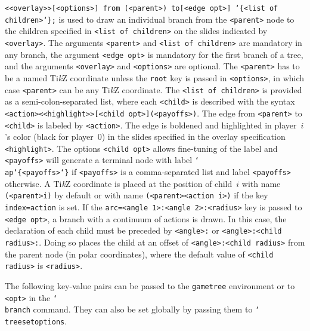\documentclass{article}
\newenvironment{desc}{\itemize[leftmargin=50pt]}{\enditemize}
\def\macroarg#1#2{\item[\cmd{#1}] \hskip-2.5pt\texttt{#2}}
\renewcommand{\textbackslash}{\char`\\}
\def\cmd#1{\texttt{\color{cmd}\textbackslash#1}}
\def\leftbrace{\char`\{}
\def\rightbrace{\char`\}}
\def\arg#1{{\color{cmd}\leftbrace}{\color{black}#1}{\color{cmd}\rightbrace}}
\def\optarg[#1]{{\color{player1}[#1]}}
\def\TikZ{Ti\emph{k}Z\xspace}
\begin{document}
\begin{desc}
\macroarg{branch}{<<overlay>>\optarg[<options>] from (<parent>) to\optarg[<edge opt>] \arg{<list of children>};} is used to draw an individual branch from the \texttt{<parent>} node to the children specified in \texttt{<list of children>} on the slides indicated by \texttt{<overlay>}. The arguments \texttt{<parent>} and \texttt{<list of children>} are mandatory in any branch, the argument \texttt{<edge opt>} is mandatory for the first branch of a tree, and the arguments \texttt{<overlay>} and \texttt{<options>} are optional. The \texttt{<parent>} has to be a named \TikZ coordinate unless the \texttt{root} key is passed in \texttt{<options>}, in which case \texttt{<parent>} can be any \TikZ coordinate. The \texttt{<list of children>} is provided as a semi-colon-separated list, where each \texttt{<child>} is described with the syntax \texttt{<action><<highlight>>\optarg[<child opt>](<payoffs>)}. The edge from \texttt{<parent>} to \texttt{<child>} is labeled by \texttt{<action>}. The edge is boldened and highlighted in player~$i$'s color (black for player~$0$) in the slides specified in the overlay specification \texttt{<highlight>}. The options \texttt{<child opt>} allows fine-tuning of the label and \texttt{<payoffs>} will generate a terminal node with label \cmd{ap\arg{<payoffs>}} if \texttt{<payoffs>} is a comma-separated list and label \texttt{<payoffs>} otherwise. A \TikZ coordinate is placed at the position of child~$i$ with name \texttt{(<parent>i)} by default or with name \texttt{(<parent><action i>)} if the key \texttt{index=action} is set. If the \texttt{arc=<angle 1>:<angle 2>:<radius>} key is passed to \texttt{<edge opt>}, a branch with a continuum of actions is drawn. In this case, the declaration of each child must be preceded by \texttt{<angle>:} or \texttt{<angle>:<child radius>:}. Doing so places the child at an offset of \texttt{<angle>:<child radius>} from the parent node (in polar coordinates), where the default value of \texttt{<child radius>} is \texttt{<radius>}.
\end{desc}

\noindent The following key-value pairs can be passed to the \texttt{gametree} environment or to \texttt{<opt>} in the \cmd{branch} command. They can also be set globally by passing them to \cmd{treesetoptions}.
\end{document}
